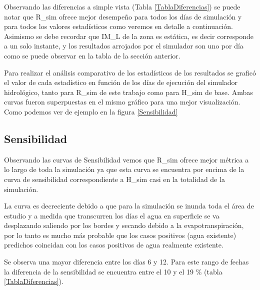 \documentclass[10pt,a4paper, twoside]{report}
\begin{document}
Observando las diferencias a simple vista (Tabla \ref{TablaDiferencias}) se puede notar que R\_sim ofrece mejor desempeño para todos los días de simulación y para todos los valores estadísticos como veremos en detalle a continuación. Asimismo se debe recordar que IM\_L de la zona es estática, es decir corresponde a un solo instante, y los resultados arrojados por el simulador son uno por día como se puede observar en la tabla de la sección anterior.



Para realizar el análisis comparativo de los estadísticos de los resultados se graficó el valor de cada estadístico en función de los días de ejecución del simulador hidrológico, tanto para R\_sim de este trabajo como para H\_sim de base. Ambas curvas fueron superpuestas en el mismo gráfico para una mejor visualización. Como podemos ver de ejemplo en la figura \ref{Sensibilidad}

\subsection{Sensibilidad}

Observando las curvas de Sensibilidad vemos que R\_sim ofrece mejor métrica a lo largo de toda la simulación ya que esta curva se encuentra por encima de la curva de sensibilidad correspondiente a H\_sim casi en la totalidad de la simulación.

La curva es decreciente debido a que para la simulación se inunda toda el área de estudio y a medida que transcurren los días el agua en superficie se va desplazando saliendo por los bordes y secando debido a la evapotranspiración, por lo tanto es mucho más probable que los casos positivos (agua existente) predichos coincidan con los casos positivos de agua realmente existente.

Se observa una mayor diferencia entre los días 6 y 12. Para este rango de fechas la diferencia de la sensibilidad se encuentra entre el 10 y el 19 \% (tabla \ref{TablaDiferencias}).
\end{document}
